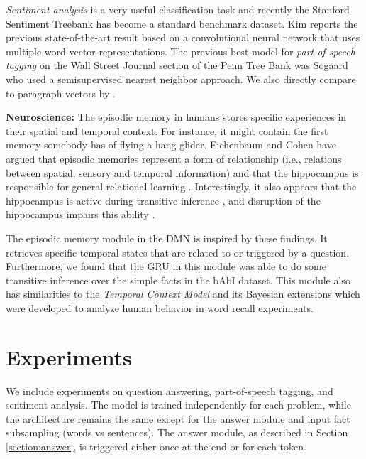 \documentclass{article}
\begin{document}
\emph{Sentiment analysis} is a very useful classification task and recently the Stanford Sentiment Treebank \cite{Socher2013EMNLP} has become a standard benchmark dataset. Kim \cite{Kim2014} reports the previous state-of-the-art result based on a convolutional neural network that uses multiple word vector representations.
The previous best model for \emph{part-of-speech tagging} on the Wall Street Journal section of the Penn Tree Bank \cite{Marcus1993} was Sogaard \cite{Sogaard2011} who used a semisupervised nearest neighbor approach. We also directly compare to paragraph vectors by \cite{Le2014}.


\textbf{Neuroscience:}   
The episodic memory in humans stores specific experiences in their spatial and temporal context. For instance, it might contain the first memory somebody has of flying a hang glider. Eichenbaum and Cohen have argued that episodic memories represent a form of relationship  (i.e., relations between spatial, sensory and temporal information) and that the hippocampus is responsible for general relational learning \cite{Eichenbaum2004}. Interestingly, it also appears that the hippocampus is active during transitive inference \cite{Heckers2004}, and disruption of the hippocampus impairs this ability \cite{Dusek1997}. 

The episodic memory module in the DMN is inspired by these findings. It retrieves specific temporal states that are related to or triggered by a question. Furthermore, we found that the GRU in this module was able to do some transitive inference over the simple facts in the bAbI dataset.
This module also has similarities to the \emph{Temporal Context Model} \cite{Howard2002} and its Bayesian extensions \cite{Socher2009} which were developed to analyze human behavior in word recall experiments.








\section{Experiments}

We include experiments on question answering, part-of-speech tagging, and sentiment analysis. The model is trained independently for each problem, while the architecture remains the same except for the answer module and input fact subsampling (words vs sentences). The answer module, as described in Section \ref{section:answer}, is triggered either once at the end or for each token.
\end{document}

